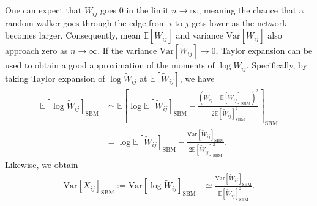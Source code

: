 \documentclass[12pt]{article} %
\def\Exp{{\mathbb E}}
\def\Var{\text{Var}}
\begin{document}
One can expect that $\tilde W_{ij}$ goes $0$ in the limit $n \rightarrow \infty$, meaning the chance that a random walker goes through the edge from $i$ to $j$ gets lower as the network becomes larger.
Consequently, mean $\Exp[\tilde W_{ij}]$ and variance $\Var[\tilde W_{ij}]$ also approach zero as $n\rightarrow \infty$.
If the variance $\Var[\tilde W_{ij}] \rightarrow 0$, Taylor expansion can be used to obtain a good approximation of the moments of $\log W_{ij}$.
Specifically, by taking Taylor expansion of $\log \tilde W_{ij}$ at $\Exp[\tilde W_{ij}]$, we have
\begin{align}
    \Exp\left[ \log \tilde W_{ij}\right]_{\text{SBM}} & \simeq \Exp\left[ \log \Exp\left[ \tilde W_{ij}\right]_{\text{SBM}} -\frac{\left(\tilde W_{ij}-\Exp\left[ \tilde W_{ij}\right]_{\text{SBM}}\right)^2}{2\Exp\left[ \tilde W_{ij}\right]^2 _{\text{SBM}}} \right]_{\text{SBM}} \nonumber \\
                                                      & = \log \Exp\left[ \tilde W_{ij}\right]_{\text{SBM}} -\frac{\Var\left[\tilde W_{ij}\right]_{\text{SBM}}}{2\Exp\left[ \tilde W_{ij}\right]^2 _{\text{SBM}}}.
\end{align}
Likewise, we obtain
\begin{align}
    \label{eq:varxij}
    \Var\left[ X_{ij}\right]_{\text{SBM}}:=\Var\left[ \log \tilde W_{ij}\right]_{\text{SBM}} & \simeq \frac{\Var\left[\tilde W_{ij}\right]_{\text{SBM}}}{\Exp\left[ \tilde W_{ij}\right]^2 _{\text{SBM}}}.
\end{align}
\end{document}
